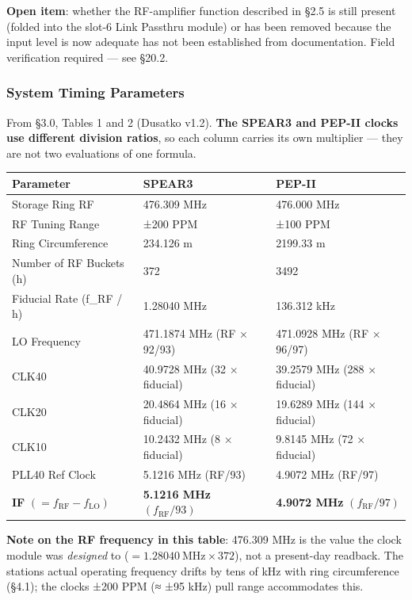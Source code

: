 \begin{keynote}
\textbf{Open item}: whether the RF-amplifier function described in  §2.5 is still present (folded into the slot-6 Link Passthru module) or has been removed because the input level is now adequate has not been established from documentation. Field verification required --- see §20.2.
\end{keynote}

\subsubsection{System Timing Parameters}

From  §3.0, Tables 1 and 2 (Dusatko v1.2). \textbf{The SPEAR3 and PEP-II clocks use different division ratios}, so each column carries its own multiplier --- they are not two evaluations of one formula.

\begin{longtable}[]{@{}lll@{}}
\toprule\noalign{}
Parameter & SPEAR3 & PEP-II \\
\midrule\noalign{}
\endhead
\bottomrule\noalign{}
\endlastfoot
Storage Ring RF & 476.309 MHz & 476.000 MHz \\
RF Tuning Range & ±200 PPM & ±100 PPM \\
Ring Circumference & 234.126 m & 2199.33 m \\
Number of RF Buckets (h) & 372 & 3492 \\
Fiducial Rate (f\_RF / h) & 1.28040 MHz & 136.312 kHz \\
LO Frequency & 471.1874 MHz (RF × 92/93) & 471.0928 MHz (RF × 96/97) \\
CLK40 & 40.9728 MHz (32 × fiducial) & 39.2579 MHz (288 × fiducial) \\
CLK20 & 20.4864 MHz (16 × fiducial) & 19.6289 MHz (144 × fiducial) \\
CLK10 & 10.2432 MHz (8 × fiducial) & 9.8145 MHz (72 × fiducial) \\
PLL40 Ref Clock & 5.1216 MHz (RF/93) & 4.9072 MHz (RF/97) \\
\textbf{IF} $(= f_\text{RF} - f_\text{LO})$ & \textbf{5.1216 MHz} $(f_\text{RF}/93)$ & \textbf{4.9072 MHz} $(f_\text{RF}/97)$ \\
\end{longtable}

\begin{keynote}
\textbf{Note on the RF frequency in this table}: 476.309 MHz is the value the clock module was \emph{designed} to ($= \qty{1.28040}{\mega\hertz} \times 372$), not a present-day readback. The station\textquotesingle s actual operating frequency drifts by tens of kHz with ring circumference (§4.1); the clock\textquotesingle s ±200 PPM (≈ ±95 kHz) pull range accommodates this.
\end{keynote}

